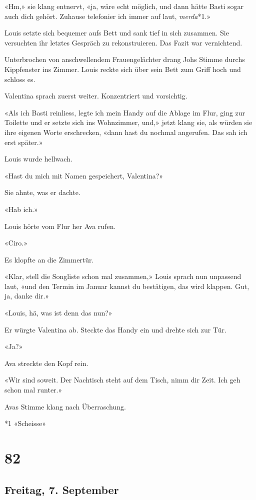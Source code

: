 «Hm,» sie klang entnervt, «ja, wäre echt möglich, und dann hätte Basti
sogar auch dich gehört. Zuhause telefonier ich immer auf laut,
\emph{merda}*1.»

Louis setzte sich bequemer aufs Bett und sank tief in sich zusammen. Sie
versuchten ihr letztes Gespräch zu rekonstruieren. Das Fazit war
vernichtend.

Unterbrochen von anschwellendem Frauengelächter drang Johs Stimme durchs
Kippfenster ins Zimmer. Louis reckte sich über sein Bett zum Griff hoch
und schloss es.

Valentina sprach zuerst weiter. Konzentriert und vorsichtig.

«Als ich Basti reinliess, legte ich mein Handy auf die Ablage im Flur,
ging zur Toilette und er setzte sich ins Wohnzimmer, und,» jetzt klang
sie, als würden sie ihre eigenen Worte erschrecken, «dann hast du
nochmal angerufen. Das sah ich erst später.»

Louis wurde hellwach.

«Hast du mich mit Namen gespeichert, Valentina?»

Sie ahnte, was er dachte.

«Hab ich.»

Louis hörte vom Flur her Ava rufen.

«Ciro.»

Es klopfte an die Zimmertür.

«Klar, stell die Songliste schon mal zusammen,» Louis sprach nun
unpassend laut, «und den Termin im Januar kannst du bestätigen, das wird
klappen. Gut, ja, danke dir.»

«Louis, hä, was ist denn das nun?»

Er würgte Valentina ab. Steckte das Handy ein und drehte sich zur Tür.

«Ja?»

Ava streckte den Kopf rein.

«Wir sind soweit. Der Nachtisch steht auf dem Tisch, nimm dir Zeit. Ich
geh schon mal runter.»

Avas Stimme klang nach Überraschung.

*1 «Scheisse»

\chapter{82}\label{section-82}

\section{Freitag, 7. September}\label{freitag-7.-september-1}

